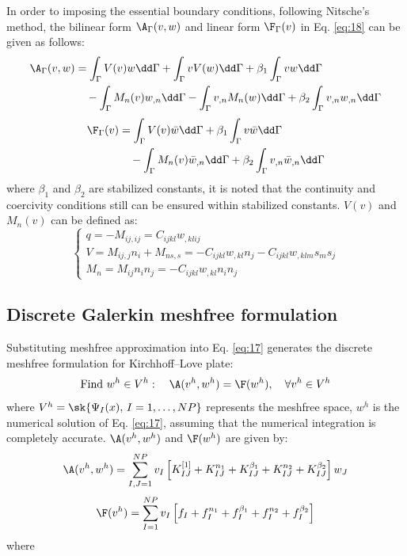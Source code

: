 In order to imposing the essential boundary conditions, following Nitsche's method, the bilinear form $\A_{\Gamma}(v,w)$ and linear form $\F_{\Gamma}(v)$ in Eq. \eqref{eq:18} can be given as follows:
\begin{equation}\label{eq:23}
\begin{aligned}
\A_{\Gamma}(v,w)&=\int_{\Gamma}V(v)w\dd\Gamma+\int_{\Gamma}vV(w)\dd\Gamma+\beta_1\int_{\Gamma}vw\dd\Gamma\\
&\quad-\int_{\Gamma}M_n(v)w_{,n}\dd\Gamma-\int_{\Gamma}v_{,n}M_n(w)\dd\Gamma+\beta_2\int_{\Gamma}v_{,n}w_{,n}\dd\Gamma
\end{aligned}
\end{equation}
\begin{equation}\label{eq:24}
\begin{aligned}
\F_{\Gamma}(v)&=\int_{\Gamma}V(v)\bar{w}\dd\Gamma+\beta_1\int_{\Gamma}v\bar{w}\dd\Gamma\\
&\quad-\int_{\Gamma}M_n(v)\bar{w}_{,n}\dd\Gamma+\beta_2\int_{\Gamma}v_{,n}\bar{w}_{,n}\dd\Gamma
\end{aligned}
\end{equation}
where $\beta_1$ and $\beta_2$ are stabilized constants, it is noted that the continuity and coercivity conditions still can be ensured within stabilized constants.
$V(v)$ and $M_n(v)$ can be defined as:
\begin{equation}\label{eq:25}
\begin{cases}
q=-M_{ij,ij}=C_{ijkl}w_{,klij}\\[2pt]
V=M_{ij,j}n_i+M_{ns,s}=-C_{ijkl}w_{,kl}n_j-C_{ijkl}w_{,klm}s_ms_j\\[2pt]
M_n=M_{ij}n_in_j=-C_{ijkl}w_{,kl}n_in_j
\end{cases}
\end{equation}

\subsection{Discrete Galerkin meshfree formulation}\label{sec:discrete}

Substituting meshfree approximation into Eq. \eqref{eq:17} generates the discrete meshfree formulation for Kirchhoff--Love plate:
\begin{equation}\label{eq:26}
\text{Find }w^{h}\in V^{h}:\quad \A(v^{h},w^{h})=\F(w^{h}),\quad \forall v^{h}\in V^{h}
\end{equation}
where $V^{h}=\sk\{\Psi_I(x),\,I=1,\ldots,NP\}$ represents the meshfree space, $w^{h}$ is the numerical solution of Eq. \eqref{eq:17}, assuming that the numerical integration is completely accurate.
$\A(v^{h},w^{h})$ and $\F(w^{h})$ are given by:
\begin{equation}\label{eq:27}
\A(v^{h},w^{h})=\sum_{I,J=1}^{NP}v_I\left[K_{IJ}^{[1]}+K_{IJ}^{n_1}+K_{IJ}^{\beta_1}+K_{IJ}^{n_2}+K_{IJ}^{\beta_2}\right]w_J
\end{equation}
\begin{equation}\label{eq:28}
\F(v^{h})=\sum_{I=1}^{NP}v_I\left[f_I+f_I^{n_1}+f_I^{\beta_1}+f_I^{n_2}+f_I^{\beta_2}\right]
\end{equation}
where

